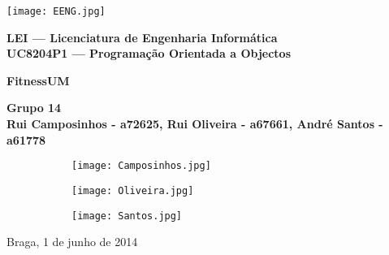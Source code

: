 \begin{titlepage}
\begin{center}

\begin{flushleft}
\texttt{[image: EENG.jpg]}\\
\end{flushleft}

\vspace{2cm}

\Large{\textbf{LEI --- Licenciatura de Engenharia Informática}}\\
\vspace{1cm}
\Large{\textbf{UC8204P1 --- Programação Orientada a Objectos}}\\

\vspace{2.5cm}

\Huge{\textbf{FitnessUM}} \\

\vspace{2cm}

\Large{\textbf{Grupo 14}}\\
\vspace{0.5cm}
\normalsize{\textbf{Rui Camposinhos - a72625, Rui Oliveira - a67661, André Santos - a61778}}\\
\vspace{0.5cm}
\begin{figure}[h]
\centering
\begin{subfigure}{.2\textwidth}
  \centering
  \texttt{[image: Camposinhos.jpg]}
\end{subfigure}
\begin{subfigure}{.2\textwidth}
  \centering
  \texttt{[image: Oliveira.jpg]}
\end{subfigure}
\begin{subfigure}{.2\textwidth}
  \centering
  \texttt{[image: Santos.jpg]}
\end{subfigure}
\end{figure}

\vspace{2cm}
Braga, 1 de junho de 2014

\end{center}

\end{titlepage}